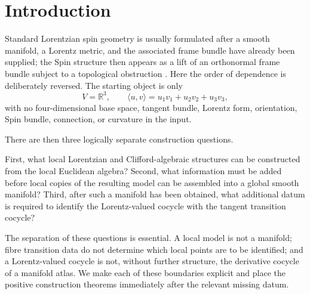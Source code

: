\documentclass[11pt,a4paper]{article}
\theoremstyle{definition}
\theoremstyle{remark}
\newcommand{\R}{\mathbb{R}}
\begin{document}
\tableofcontents
\clearpage

\section{Introduction}

Standard Lorentzian spin geometry is usually formulated after
a smooth manifold, a Lorentz metric, and the associated frame bundle have
already been supplied; the Spin structure then appears as a lift of an
orthonormal frame bundle subject to a topological obstruction
\cite{LawsonMichelsohn,MilnorStasheff,Steenrod}.  Here the order of
dependence is deliberately reversed.  The starting object is only
\[
   V=\R^{3},\qquad
   \langle u,v\rangle=u_{1}v_{1}+u_{2}v_{2}+u_{3}v_{3},
\]
with no four-dimensional base space, tangent bundle, Lorentz form,
orientation, Spin bundle, connection, or curvature in the input.

There are then three logically separate construction questions.

First, what local Lorentzian and Clifford-algebraic structures can be
constructed from the local Euclidean algebra?  Second, what information must be
added before local copies of the resulting model can be assembled into a
global smooth manifold?  Third, after such a manifold has been obtained,
what additional datum is required to identify the Lorentz-valued cocycle with the tangent transition cocycle?

The separation of these questions is essential.  A local model is not a
manifold; fibre transition data do not determine which local points
are to be identified; and a Lorentz-valued cocycle is not, without
further structure, the derivative cocycle of a manifold atlas.  We make
each of these boundaries explicit and place the positive construction
theorems immediately after the relevant missing datum.
\end{document}
